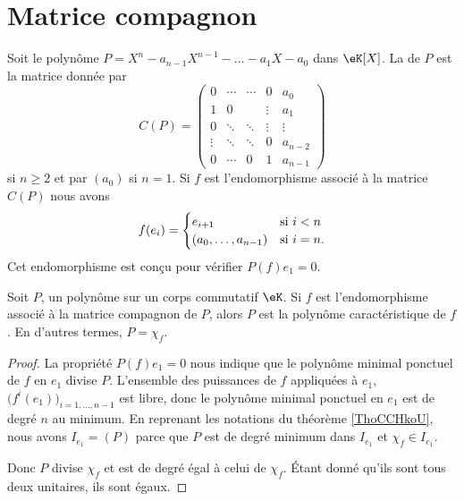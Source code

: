 \section{Matrice compagnon}

Soit le polynôme \( P=X^n-a_{n-1}X^{n-1}-\ldots-a_1X-a_0\) dans \( \eK[X]\). La  de \( P\) est la matrice donnée par
\begin{equation}
    C(P)=\begin{pmatrix}
        0    &   \cdots    &   \cdots    &   0    &   a_0\\  
        1    &   0    &       &   \vdots    &   a_1\\  
        0    &   \ddots    &   \ddots    &   \vdots    &   \vdots\\  
        \vdots    &   \ddots    &   \ddots    &   0    &   a_{n-2}\\  
        0    &   \cdots    &   0    &   1    &   a_{n-1}    
    \end{pmatrix}
\end{equation}
si \( n\geq 2\) et par \( (a_0)\) si \( n=1\). Si \( f\) est l'endomorphisme associé à la matrice \( C(P)\) nous avons
\begin{equation}
    f(e_i)=\begin{cases}
        e_{i+1}    &   \text{si \( i<n\)}\\
        (a_0,\ldots, a_{n-1})    &    \text{si \( i=n\)}.
    \end{cases}
\end{equation}
Cet endomorphisme est conçu pour vérifier \( P(f)e_1=0\).

\begin{lemma}
    Soit \( P\), un polynôme sur un corps commutatif \( \eK\). Si \( f\) est l'endomorphisme associé à la matrice compagnon de \( P\), alors \( P\) est la polynôme caractéristique de \( f\). En d'autres termes, \( P=\chi_f\).
\end{lemma}

\begin{proof}
    La propriété \( P(f)e_1=0\) nous indique que le polynôme minimal ponctuel de \( f\) en \( e_1\) divise \( P\). L'ensemble des puissances de \( f\) appliquées à \( e_1\), \( \big( f^i(e_1) \big)_{i=1,\ldots, n-1}\) est libre, donc le polynôme minimal ponctuel en \( e_1\) est de degré \( n\) au minimum. En reprenant les notations du théorème \ref{ThoCCHkoU}, nous avons \( I_{e_1}=(P)\) parce que \( P\) est de degré minimum dans \( I_{e_1}\) et \( \chi_f\in I_{e_1}\).

    Donc \( P\) divise \( \chi_f\) et est de degré égal à celui de \( \chi_f\). Étant donné qu'ils sont tous deux unitaires, ils sont égaux.
\end{proof}


